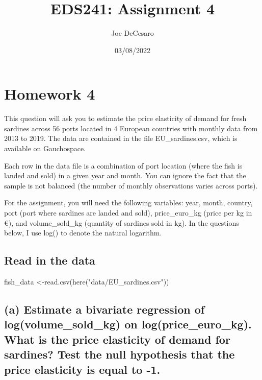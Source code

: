 \documentclass[
]{article}
\title{EDS241: Assignment 4}
\author{Joe DeCesaro}
\date{03/08/2022}
\newenvironment{Shaded}{\begin{snugshade}}{\end{snugshade}}
\newcommand{\FunctionTok}[1]{\textcolor[rgb]{0.00,0.00,0.00}{#1}}
\newcommand{\NormalTok}[1]{#1}
\newcommand{\OtherTok}[1]{\textcolor[rgb]{0.56,0.35,0.01}{#1}}
\newcommand{\StringTok}[1]{\textcolor[rgb]{0.31,0.60,0.02}{#1}}
\begin{document}
\maketitle

\hypertarget{homework-4}{%
\section{Homework 4}\label{homework-4}}

\noindent This question will ask you to estimate the price elasticity of
demand for fresh sardines across 56 ports located in 4 European
countries with monthly data from 2013 to 2019. The data are contained in
the file EU\_sardines.csv, which is available on Gauchospace.

\noindent Each row in the data file is a combination of port location
(where the fish is landed and sold) in a given year and month. You can
ignore the fact that the sample is not balanced (the number of monthly
observations varies across ports).

\noindent For the assignment, you will need the following variables:
year, month, country, port (port where sardines are landed and sold),
price\_euro\_kg (price per kg in €), and volume\_sold\_kg (quantity of
sardines sold in kg). In the questions below, I use log() to denote the
natural logarithm.

\hypertarget{read-in-the-data}{%
\subsection{Read in the data}\label{read-in-the-data}}

\begin{Shaded}
\begin{Highlighting}[]
\NormalTok{fish\_data }\OtherTok{\textless{}{-}}\FunctionTok{read.csv}\NormalTok{(}\FunctionTok{here}\NormalTok{(}\StringTok{"data/EU\_sardines.csv"}\NormalTok{))}
\end{Highlighting}
\end{Shaded}

\hypertarget{a-estimate-a-bivariate-regression-of-logvolume_sold_kg-on-logprice_euro_kg.-what-is-the-price-elasticity-of-demand-for-sardines-test-the-null-hypothesis-that-the-price-elasticity-is-equal-to--1.}{%
\subsection{(a) Estimate a bivariate regression of log(volume\_sold\_kg)
on log(price\_euro\_kg). What is the price elasticity of demand for
sardines? Test the null hypothesis that the price elasticity is equal to
-1.}\label{a-estimate-a-bivariate-regression-of-logvolume_sold_kg-on-logprice_euro_kg.-what-is-the-price-elasticity-of-demand-for-sardines-test-the-null-hypothesis-that-the-price-elasticity-is-equal-to--1.}}
\end{document}
